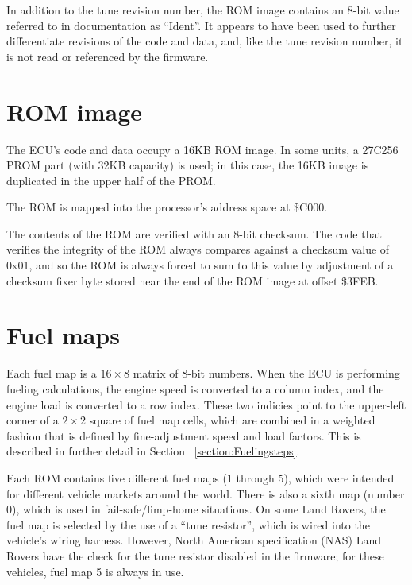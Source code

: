 \documentclass[11pt,twocolumn]{scrartcl}
\begin{document}
In addition to the tune revision number, the ROM image contains an 8-bit value referred to in documentation as ``Ident''. It appears to have been used to further differentiate revisions of the code and data, and, like the tune revision number, it is not read or referenced by the firmware.

\section {ROM image}
The ECU's code and data occupy a 16KB ROM image. In some units, a 27C256 PROM part (with 32KB capacity) is used; in this case, the 16KB image is duplicated in the upper half of the PROM.

The ROM is mapped into the processor's address space at \$C000.

The contents of the ROM are verified with an 8-bit checksum. The code that verifies the integrity of the ROM always compares against a checksum value of 0x01, and so the ROM is always forced to sum to this value by adjustment of a checksum fixer byte stored near the end of the ROM image at offset \$3FEB.

\section {Fuel maps}
Each fuel map is a $16\times8$ matrix of 8-bit numbers. When the ECU is performing fueling calculations, the engine speed is converted to a column index, and the engine load is converted to a row index. These two indicies point to the upper-left corner of a $2\times2$ square of fuel map cells, which are combined in a weighted fashion that is defined by fine-adjustment speed and load factors. This is described in further detail in Section ~\ref{section:Fuelingsteps}.

Each ROM contains five different fuel maps (1 through 5), which were intended for different vehicle markets around the world. There is also a sixth map (number 0), which is used in fail-safe/limp-home situations. On some Land Rovers, the fuel map is selected by the use of a ``tune resistor'', which is wired into the vehicle's wiring harness. However, North American specification (NAS) Land Rovers have the check for the tune resistor disabled in the firmware; for these vehicles, fuel map 5 is always in use.
\end{document}

